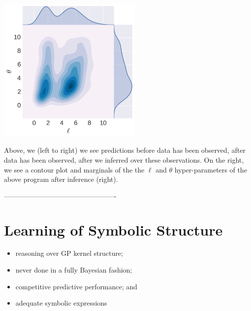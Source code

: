 \documentclass[a0,portrait]{a0poster}
\begin{document}
\begin{multicols}{2}
\begin{table} %
\begin{center}
\includegraphics[width=7cm]{neal_contour_l_vs_sf_s__marginal_after.png} 
\end{center}
\end{table}
 Above, we (left to right) we see predictions before data has been observed, after data has been observed, after we inferred over these observations. On the right, we see a contour plot and marginals of the the $\ell$ and $\theta$ hyper-parameters of the above program after inference (right).

-------------------------------------------------


\section*{Learning of Symbolic Structure}
\begin{itemize}
\setlength{\itemindent}{1cm}
 \item reasoning over GP kernel structure;
 \item never done in a fully Bayesian fashion;
 \item competitive predictive performance; and
 \item adequate symbolic expressions
 \end{itemize}

\end{multicols}
\end{document}
